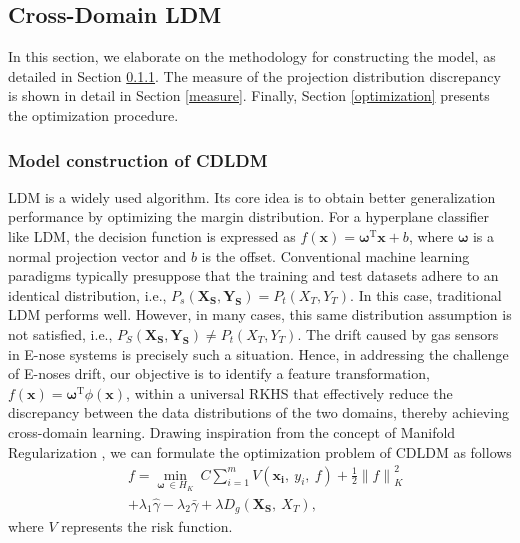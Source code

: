 \documentclass[a4paper]{cas-sc}
\begin{document}
\subsection{Cross-Domain LDM} \label{MODEL}
In this section, we elaborate on the methodology for constructing the model, as detailed in Section \ref{construction}.
The measure of the projection distribution discrepancy is shown in detail in Section \ref{measure}. Finally, Section \ref{optimization} presents the optimization procedure.

\subsubsection{Model construction of CDLDM}\label{construction}
LDM is a widely used algorithm. Its core idea is to obtain better generalization performance by optimizing the margin distribution. For a hyperplane classifier like LDM, the decision function is expressed as $f(\boldsymbol{x}) = \boldsymbol{\omega}^\mathrm{T}\boldsymbol{x}+b$, where $\boldsymbol{\omega}$ is a normal projection vector and $b$ is the offset. 
Conventional machine learning paradigms typically presuppose that the training and test datasets adhere to an identical distribution, i.e., $P_s(\boldsymbol{X_S},\boldsymbol{Y_S}) = P_t(X_T,Y_T)$. In this case, traditional LDM performs well. However, in many cases, this same distribution assumption is not satisfied, i.e., $P_S(\boldsymbol{X_S},\boldsymbol{Y_S}) \neq P_t(X_T,Y_T)$. The drift caused by gas sensors in E-nose systems is precisely such a situation. Hence, in addressing the challenge of E-noses drift, our objective is to identify a feature transformation, $f(\boldsymbol{x}) = \boldsymbol{\omega}^\mathrm{T} \phi(\boldsymbol{x})$, within a universal RKHS that effectively reduce the discrepancy between the data distributions of the two domains, thereby achieving cross-domain learning. Drawing inspiration from the concept of Manifold Regularization \citep{belkin2006manifold}, we can formulate the optimization problem of CDLDM as follows
\begin{equation}
\label{cdldm1}
\begin{aligned}
&f = \min _{\boldsymbol{\omega}\ \in H_K} \ C \sum_{i=1}^{m} V(\boldsymbol{x_i},\ y_{i},\ f)+\frac{1}{2}{\|f\|}_{K}^{2} \\
&+\lambda_1\widehat \gamma - \lambda_2\bar \gamma+\lambda D_{g}(\boldsymbol{X_S},\ X_T),
\end{aligned}
\end{equation}
where $V$ represents the risk function. 
\end{document}
